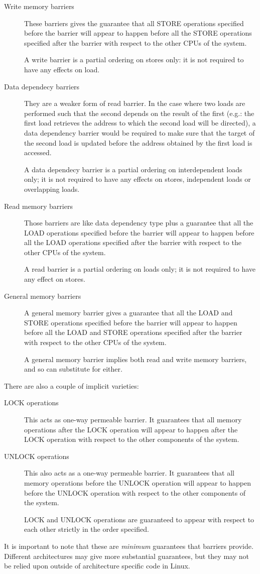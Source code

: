 \begin{description}
\item[Write memory barriers] These barriers gives the guarantee that all STORE operations
specified before the barrier will appear to happen before all the STORE operations
specified after the barrier with respect to the other CPUs of the system.

A write barrier is a partial ordering on stores only: it is not required to have any
effects on load.
\item[Data dependecy barriers] They are a weaker form of read barrier. In the case
where two loads are performed such that the second depends on the result of the first
(e.g.: the first load retrieves the address to which the second load will be directed),
a data dependency barrier would be required to make sure that the target of the second
load is updated before the address obtained by the first load is accessed.

A data dependecy barrier is a partial ordering on interdependent loads only; it is not
required to have any effects on stores, independent loads or overlapping loads.
\item[Read memory barriers] Those barriers are like data dependency type plus a guarantee
that all the LOAD operations specified before the barrier will appear to happen before
all the LOAD operations specified after the barrier with respect to the other CPUs of
the system.

A read barrier is a partial ordering on loads only; it is not required to have any effect
on stores.
\item[General memory barriers] A general memory barrier gives a guarantee that all the
LOAD and STORE operations specified before the barrier will appear to happen before all
the LOAD and STORE operations specified after the barrier with respect to the other CPUs
of the system.

A general memory barrier implies both read and write memory barriers, and so can substitute
for either.
\end{description}

There are also a couple of implicit varieties:

\begin{description}
\item[LOCK operations] This acts as one-way permeable barrier. It guarantees that all
memory operations after the LOCK operation will appear to happen after the LOCK operation
with respect to the other components of the system.
\item[UNLOCK operations] This also acts as a one-way permeable barrier. It guarantees that
all memory operations before the UNLOCK operation will appear to happen before the UNLOCK
operation with respect to the other components of the system.

LOCK and UNLOCK operations are guaranteed to appear with respect to each other strictly
in the order specified.
\end{description}
It is important to note that these are \emph{minimum} guarantees that barriers provide.
Different architectures may give more substantial guarantees, but they may not be
relied upon outside of architecture specific code in Linux.

